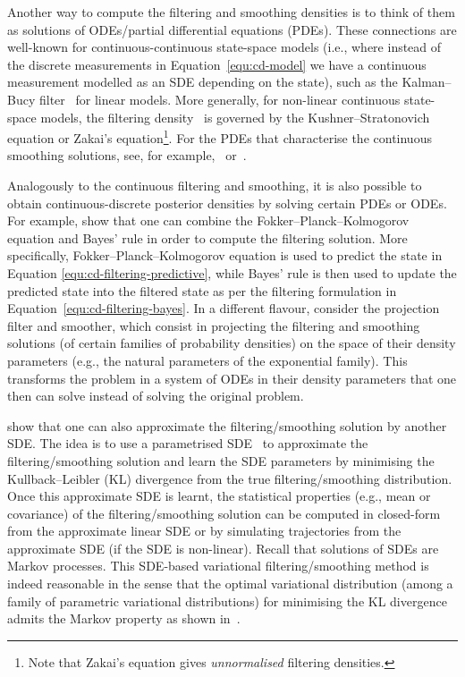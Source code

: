 Another way to compute the filtering and smoothing densities is to think of them as solutions of ODEs/partial differential equations (PDEs). These connections are well-known for continuous-continuous state-space models (i.e., where instead of the discrete measurements in Equation~\eqref{equ:cd-model} we have a continuous measurement modelled as an SDE depending on the state), such as the Kalman--Bucy filter~\citep{KalmanBucy1961} for linear models. More generally, for non-linear continuous state-space models, the filtering density~\citep{Kushner1964, Zakai1969, Bain2009, Sarkka2013} is governed by the Kushner--Stratonovich equation or Zakai's equation\footnote{Note that Zakai's equation gives \emph{unnormalised} filtering densities.}. For the PDEs that characterise the continuous smoothing solutions, see, for example,~\citet[][Algorithm 10.30]{Sarkka2019} or~\citet{Anderson1972}.

Analogously to the continuous filtering and smoothing, it is also possible to obtain continuous-discrete posterior densities by solving certain PDEs or ODEs. For example, \citet{Jazwinski1970, Beard1999, Challa2000} show that one can combine the Fokker--Planck--Kolmogorov equation and Bayes' rule in order to compute the filtering solution. More specifically, Fokker--Planck--Kolmogorov equation is used to predict the state in Equation \eqref{equ:cd-filtering-predictive}, while Bayes' rule is then used to update the predicted state into the filtered state as per the filtering formulation in Equation~\eqref{equ:cd-filtering-bayes}. In a different flavour, \citet{Brigo1998, Koyama2018} consider the projection filter and smoother, which consist in projecting the filtering and smoothing solutions (of certain families of probability densities) on the space of their density parameters (e.g., the natural parameters of the exponential family). This transforms the problem in a system of ODEs in their density parameters that one then can solve instead of solving the original problem.

\citet{Archambeau2007, Archambeau2008, XuechenLi2020} show that one can also approximate the filtering/smoothing solution by another SDE. The idea is to use a parametrised SDE~\citep[e.g., a linear SDE is used in][]{Archambeau2007, Archambeau2008} to approximate the filtering/smoothing solution and learn the SDE parameters by minimising the Kullback--Leibler (KL) divergence from the true filtering/smoothing distribution. Once this approximate SDE is learnt, the statistical properties (e.g., mean or covariance) of the filtering/smoothing solution can be computed in closed-form from the approximate linear SDE or by simulating trajectories from the approximate SDE (if the SDE is non-linear). Recall that solutions of SDEs are Markov processes. This SDE-based variational filtering/smoothing method is indeed reasonable in the sense that the optimal variational distribution (among a family of parametric variational distributions) for minimising the KL divergence admits the Markov property as shown in~\citet[][Lemma 1]{Courts2021}.

